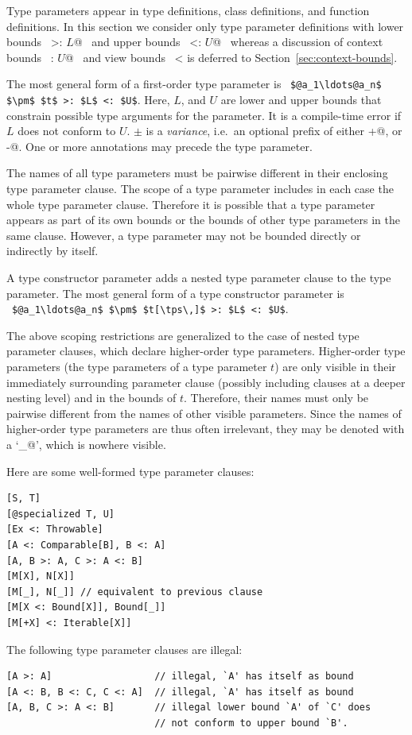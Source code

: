 Type parameters appear in type definitions, class definitions, and
function definitions.  In this section we consider only type parameter
definitions with lower bounds ~\lstinline@>: $L$@~ and upper bounds
~\lstinline@<: $U$@~ whereas a discussion of context bounds
~\lstinline@: $U$@~ and view bounds ~\lstinline@<% $U$@~ 
is deferred to Section~\ref{sec:context-bounds}.

The most general form of a first-order type parameter is
~\lstinline!$@a_1\ldots@a_n$ $\pm$ $t$ >: $L$ <: $U$!.  
Here, $L$, and $U$ are lower and upper bounds that
constrain possible type arguments for the parameter.  It is a
compile-time error if $L$ does not conform to $U$. $\pm$ is a {\em
variance}, i.e.\ an optional prefix of either \lstinline@+@, or
\lstinline@-@. One or more annotations may precede the type parameter.


The names of all type parameters must be pairwise different in their enclosing type parameter clause.  The scope of a type parameter includes in each case the whole type parameter clause. Therefore it is possible that a type parameter appears as part of its own bounds or the bounds of other type parameters in the same clause.  However, a type parameter may not be bounded directly or indirectly by itself.\

A type constructor parameter adds a nested type parameter clause to the type parameter. The most general form of a type constructor parameter is ~\lstinline!$@a_1\ldots@a_n$ $\pm$ $t[\tps\,]$ >: $L$ <: $U$!.  

The above scoping restrictions are generalized to the case of nested type parameter clauses, which declare higher-order type parameters. Higher-order type parameters (the type parameters of a type parameter $t$) are only visible in their immediately surrounding parameter clause (possibly including clauses at a deeper nesting level) and in the bounds of $t$. Therefore, their names must only be pairwise different from the names of other visible parameters. Since the names of higher-order type parameters are thus often irrelevant, they may be denoted with a `\lstinline@_@', which is nowhere visible.

\example Here are some well-formed type parameter clauses:
\begin{lstlisting}
[S, T]
[@specialized T, U]
[Ex <: Throwable]
[A <: Comparable[B], B <: A]
[A, B >: A, C >: A <: B]
[M[X], N[X]]
[M[_], N[_]] // equivalent to previous clause
[M[X <: Bound[X]], Bound[_]]
[M[+X] <: Iterable[X]]
\end{lstlisting}
The following type parameter clauses are illegal:
\begin{lstlisting}
[A >: A]                  // illegal, `A' has itself as bound
[A <: B, B <: C, C <: A]  // illegal, `A' has itself as bound
[A, B, C >: A <: B]       // illegal lower bound `A' of `C' does
                          // not conform to upper bound `B'.
\end{lstlisting}

